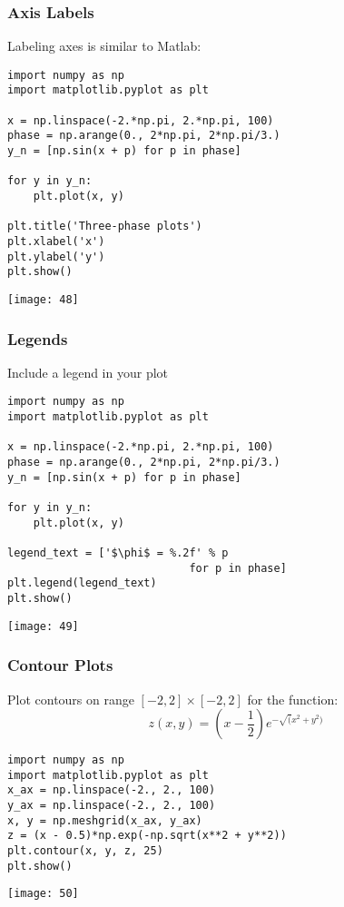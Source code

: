 \begin{frame}[fragile]
    \frametitle{Axis Labels}

    Labeling axes is similar to Matlab:
    \begin{lstlisting}
import numpy as np
import matplotlib.pyplot as plt

x = np.linspace(-2.*np.pi, 2.*np.pi, 100)
phase = np.arange(0., 2*np.pi, 2*np.pi/3.)
y_n = [np.sin(x + p) for p in phase]

for y in y_n:
    plt.plot(x, y)

plt.title('Three-phase plots')
plt.xlabel('x')
plt.ylabel('y')
plt.show()
    \end{lstlisting}
\begin{center}
\texttt{[image: 48]}
\end{center}
\end{frame}
\begin{frame}[fragile]\frametitle{Legends}

    Include a legend in your plot
    \begin{lstlisting}
import numpy as np
import matplotlib.pyplot as plt

x = np.linspace(-2.*np.pi, 2.*np.pi, 100)
phase = np.arange(0., 2*np.pi, 2*np.pi/3.)
y_n = [np.sin(x + p) for p in phase]

for y in y_n:
    plt.plot(x, y)

legend_text = ['$\phi$ = %.2f' % p
                            for p in phase]
plt.legend(legend_text)
plt.show()
    \end{lstlisting}
\begin{center}
\texttt{[image: 49]}
\end{center}
\end{frame}

\begin{frame}[fragile]\frametitle{Contour Plots}

    Plot contours on range $[-2,2]\times[-2,2]$ for the function:
    \[ z(x, y) = \left(x - \frac{1}{2}\right) e^{-\sqrt(x^2 + y^2)} \]
    \begin{lstlisting}
import numpy as np
import matplotlib.pyplot as plt
x_ax = np.linspace(-2., 2., 100)
y_ax = np.linspace(-2., 2., 100)
x, y = np.meshgrid(x_ax, y_ax)
z = (x - 0.5)*np.exp(-np.sqrt(x**2 + y**2))
plt.contour(x, y, z, 25)
plt.show()
    \end{lstlisting}
\begin{center}
\texttt{[image: 50]}
\end{center}
\end{frame}

